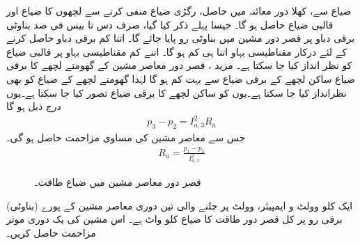ضیاع  سے، کھلا دور معائنہ میں حاصل، رگڑی ضیاع  منفی کرنے سے لچھوں کا ضیاع اور قالبی ضیاع حاصل ہو گا۔ جیسا پہلے ذکر کیا گیا، صرف دس تا بیس فی صد بناوٹی برقی دباو پر قصر دور مشین میں بناوٹی رو پایا جائے گا۔ اتنا کم برقی دباو حاصل کرنے کے لئے درکار مقناطیسی بہاو اتنا ہی کم ہو گا۔ اتنے کم مقناطیسی بہاو پر قالبی ضیاع کو نظر انداز کیا جا سکتا ہے۔ مزید ، قصر دور معاصر مشین کے گھومتے لچھے کا برقی ضیاع ساکن لچھے کے برقی ضیاع سے بہت کم ہو گا لہٰذا  گھومتے لچھے کے ضیاع کو بھی نظرانداز کیا جا سکتا ہے۔یوں  کو ساکن لچھے کا برقی ضیاع تصور کیا جا سکتا ہے۔یوں درج ذیل ہو گا
\begin{align*}
p_3-p_2=I_{a,3}^2 R_a
\end{align*}
جس  سے معاصر مشین کی مساوی مزاحمت حاصل ہو گی۔
\begin{align}
R_a=\frac{p_3-p_2}{I_{a,3}^2}
\end{align}
%
\begin{figure}
\centering
\caption{قصر دور معاصر مشین میں ضیاع طاقت۔}
\label{شکل_معاصر_کسر_دور_ضیاع}
\end{figure}
ایک   کلو وولٹ و ایمپیئر،   وولٹ پر چلنے والی تین دوری معاصر مشین کے پورے (بناوٹی) برقی رو پر  کل قصر دور طاقت کا ضیاع   کلو واٹ ہے۔ اس مشین کی یک دوری موثر مزاحمت حاصل کریں۔

